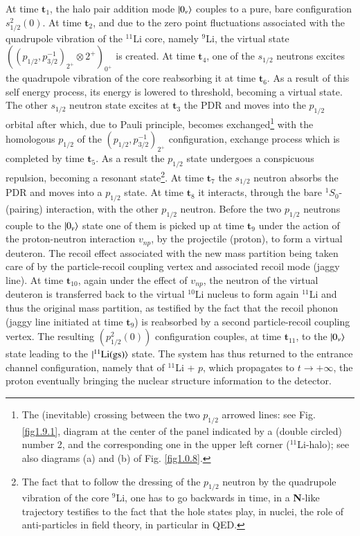  At time $\mathbf{t}_1$, the halo pair addition mode $|{0_\nu} \rangle$ couples to a pure, bare configuration $s_{1/2}^2(0)$. At time $\mathbf{t}_2$, and due to the zero point fluctuations associated with the quadrupole vibration of the $^{11}$Li core, namely $^9$Li, the virtual state $((p_{1/2},p_{3/2}^{-1})_{2^+}\otimes 2^+)_{0^+}$ is created. At time $\mathbf{t}_4$, one of the  $s_{1/2}$ neutrons excites the quadrupole vibration of the core reabsorbing it at time $\mathbf{t}_6$. As a result of this self energy process, its energy is lowered to threshold, becoming a virtual state. The other $s_{1/2}$  neutron state excites at $\mathbf{t}_3$ the PDR and moves into the $p_{1/2}$ orbital after which,  due to Pauli principle, becomes exchanged\footnote{The (inevitable) crossing between the two $p_{1/2}$ arrowed lines: see Fig. \ref{fig1.9.1},  diagram at the center of the panel indicated by a (double circled) number 2, and the corresponding one in the upper left corner ($^{11}$Li-halo); see also diagrams (a) and (b) of Fig. \ref{fig1.0.8}.} with the homologous $p_{1/2}$ of the $(p_{1/2},p_{3/2}^{-1})_{2^+}$
configuration, exchange process which is completed by time $\mathbf{t}_5$. As a result the $p_{1/2}$ state undergoes a conspicuous repulsion, becoming a resonant state\footnote{The fact that to follow the dressing of the $p_{1/2}$ neutron by the quadrupole vibration of the core $^9$Li, one has to go backwards in time, in a \textbf{N}-like trajectory testifies to the fact that the hole states play, in nuclei, the role of anti-particles in field theory, in particular in QED. }. At time $\mathbf{t}_7$ the $s_{1/2}$ neutron absorbs the PDR and moves into a $p_{1/2}$ state. At time $\mathbf{t}_8$ it interacts, through the bare $^1S_0$-(pairing) interaction, with the other $p_{1/2}$ neutron. Before the two $p_{1/2}$ neutrons couple to the $|{0_\nu} \rangle$ state one of them is picked up at time $\mathbf{t}_9$ under the action of the proton-neutron interaction $v_{np}$, by the projectile (proton), to form a virtual deuteron. The recoil effect associated with the new mass partition being taken care of by the particle-recoil coupling vertex and associated recoil mode (jaggy line). At time $\mathbf{t}_{10}$, again under the effect of $v_{np}$, the neutron of the virtual deuteron is transferred back to the virtual $^{10}$Li nucleus to form again $^{11}$Li and thus the original mass partition, as testified by the fact that the recoil phonon (jaggy line initiated at time $\mathbf{t}_9$) is reabsorbed by a second particle-recoil coupling vertex. The resulting $(p^2_{1/2}(0))$ configuration couples, at time $\mathbf{t}_{11}$, to the $|{0_\nu} \rangle$ state leading to the $|{^{11}\text{Li(gs)}} \rangle$ state. The system has thus returned to the entrance channel configuration, namely that of $^{11}$Li + $p$, which propagates to $t\to+\infty$, the proton eventually bringing the nuclear structure information to the detector.



